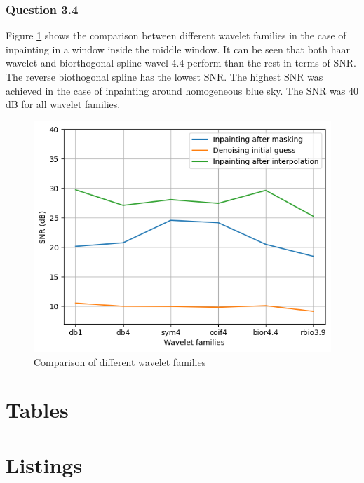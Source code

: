 \documentclass[a4paper]{article}
\begin{document}
\subsubsection{Question 3.4}
Figure \ref{windowaveletcomparer} shows the comparison between different wavelet families in the case of inpainting in a window inside the middle window. It can be seen that both haar wavelet and biorthogonal spline wavel 4.4 perform than the rest in terms of SNR. The reverse biothogonal spline has the lowest SNR. The highest SNR was achieved in the case of inpainting around homogeneous blue sky. The SNR was 40 dB for all wavelet families.

\begin{figure}[H]
	\centering %
	\includegraphics[width=0.7\linewidth]{Images/wavelet_comparison_window.png}
	\caption{Comparison of different wavelet families}
	\label{windowaveletcomparer}
\end{figure}

	\newpage

	\appendix
	
	\section{Tables}
	
	
	
	
	
	
	
	
	
	\section{Listings}

	
\end{document}
